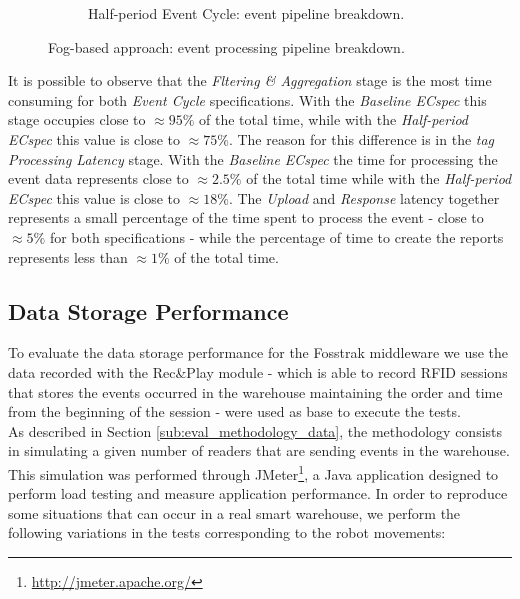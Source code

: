 \begin{figure}[ht!]
\begin{subfigure}{.5\textwidth}
    \caption{Half-period Event Cycle: event pipeline breakdown.}
    \label{fig:ecspec_effective_half}
  \end{subfigure}
  \caption[Fog-based approach: event processing breakdown.]{Fog-based approach: event processing pipeline breakdown.}
  \label{fig:ecspec_effective_breakdown}
\end{figure}

It is possible to observe that the \textit{Fltering \& Aggregation} stage is the most time consuming
for both \textit{Event Cycle} specifications. With the \textit{Baseline ECspec} this stage occupies
close to $\approx95\%$ of the total time, while with the \textit{Half-period ECspec} this value is
close to $\approx75\%$. The reason for this difference is in the \textit{tag Processing Latency} stage.
With the \textit{Baseline ECspec} the time for processing the event data represents close to $\approx2.5\%$
of the total time while with the \textit{Half-period ECspec} this value is close to $\approx18\%$.
The \textit{Upload} and \textit{Response} latency together represents a small percentage of
the time spent to process the event - close to $\approx5\%$ for both specifications - while the percentage
of time to create the reports represents less than $\approx1\%$ of the total time.\\

\subsection{Data Storage Performance}
\label{sub:eval_exp_data}
To evaluate the data storage performance for the Fosstrak middleware we use the data recorded with the Rec\&Play
module - which is able to record \gls{RFID} sessions that stores the events occurred in the warehouse
maintaining the order and time from the beginning of the session - were used as base to execute
the tests.\\

As described in Section \ref{sub:eval_methodology_data}, the methodology consists in simulating a given
number of readers that are sending events in the warehouse. This simulation was performed through
JMeter\footnote{\url{http://jmeter.apache.org/}}, a Java application designed to perform load testing
and measure application performance. In order to reproduce some situations that can occur in a real
smart warehouse, we perform the following variations in the tests corresponding to the robot movements:

